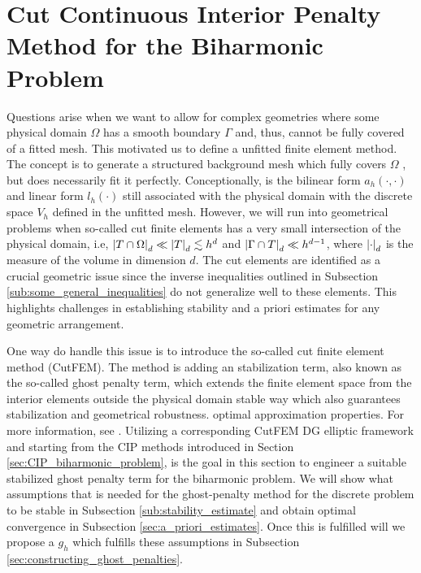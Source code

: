 \newpage
\section{Cut Continuous Interior Penalty Method for the Biharmonic Problem}%
\label{sec:cutcip_biharmonic_problem}


Questions arise when we want to allow for complex geometries where some physical domain $\Omega $ has a smooth boundary $\Gamma $ and, thus, cannot be fully covered of a fitted mesh. This motivated us to define a unfitted finite element method.
The concept is to generate a structured background mesh which fully covers $\Omega $ , but does necessarily fit it perfectly. Conceptionally, is the bilinear form $a_{h}( \cdot ,\cdot ) $  and linear form $l_{h}( \cdot ) $  still associated with the
physical domain with the discrete space $V_{h}$ defined in the unfitted mesh. However, we will run into geometrical problems when
so-called cut finite elements has a very small intersection of the physical domain, i.e, $\left\lvert  T \cap \Omega   \right\rvert_{d} \ll \left\lvert  T  \right\rvert_{d}  \lesssim h^{d}$ and $\left\lvert  \Gamma \cap T  \right\rvert_{d} \ll  h^{d-1}$, where $\left\lvert  \cdot   \right\rvert_{d} $ is the
measure of the volume in dimension $d$.
The cut elements are identified as a crucial geometric issue since the inverse inequalities outlined in Subsection \ref{sub:some_general_inequalities} do not generalize well to these elements. This highlights challenges in establishing stability and a priori estimates for any geometric arrangement.

One way do handle this issue is to introduce the so-called cut finite element method (CutFEM).
The method is adding an stabilization term, also known as the so-called ghost penalty term, which extends the finite element space from the interior elements outside the physical domain  stable way which also guarantees stabilization and geometrical robustness.
optimal approximation properties. For more information, see
\cite{burman2015cutfem, burman2010ghost, burman2022cutfem, burman2012fictitious}.
Utilizing a corresponding CutFEM DG elliptic framework \cite{gurkan2019stabilized} and starting from the CIP methods introduced in Section \ref{sec:CIP_biharmonic_problem}, is the goal in this section to engineer a suitable stabilized ghost penalty
term for the biharmonic problem.
We will show what assumptions that is needed for the ghost-penalty method for the discrete problem to be stable in Subsection \ref{sub:stability_estimate} and obtain optimal convergence in Subsection \ref{sec:a_priori_estimates}.  Once
this is fulfilled will we propose a $g_{h}$ which fulfills these assumptions in Subsection \ref{sec:constructing_ghost_penalties}.


